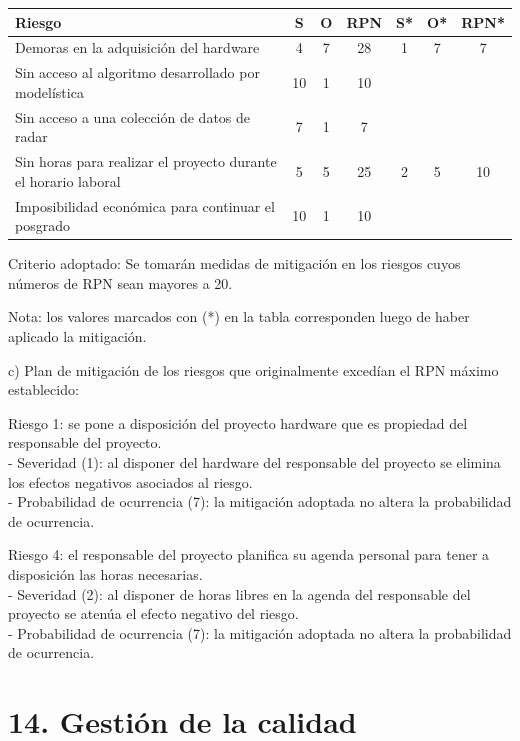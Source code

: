 \documentclass[
11pt, %
]{charter}
\begin{document}
\begin{table}[htpb]
\centering
\begin{tabularx}{\linewidth}{@{}|X|c|c|c|c|c|c|@{}}
\hline
\rowcolor[HTML]{C0C0C0} 
Riesgo                                                         & S & O & RPN & S* & O* & RPN* \\ \hline
Demoras en la adquisición del hardware                         & 4 & 7 &  28 & 1  & 7  &  7   \\ \hline
Sin acceso al algoritmo desarrollado por modelística           &10 & 1 &  10 &    &    &      \\ \hline
Sin acceso a una colección de datos de radar                   & 7 & 1 &   7 &    &    &      \\ \hline
Sin horas para realizar el proyecto durante el horario laboral & 5 & 5 &  25 & 2  & 5  &  10  \\ \hline
Imposibilidad económica para continuar el posgrado             &10 & 1 &  10 &    &    &      \\ \hline
\end{tabularx}%
\end{table}

Criterio adoptado: 
Se tomarán medidas de mitigación en los riesgos cuyos números de RPN sean
mayores a 20.

Nota: los valores marcados con (*) en la tabla corresponden luego de haber aplicado la mitigación.

c) Plan de mitigación de los riesgos que originalmente excedían el RPN máximo establecido:
 
Riesgo 1: se pone a disposición del proyecto hardware que es propiedad del
responsable del proyecto. \\
  - Severidad (1): al disponer del hardware del responsable del proyecto se
  elimina los efectos negativos asociados al riesgo.\\
  - Probabilidad de ocurrencia (7): la mitigación adoptada no altera la
  probabilidad de ocurrencia.

Riesgo 4: el responsable del proyecto planifica su agenda personal para tener a
disposición las horas necesarias.\\
  - Severidad (2): al disponer de horas libres en la agenda del responsable del
  proyecto se atenúa el efecto negativo del riesgo.\\
  - Probabilidad de ocurrencia (7): la mitigación adoptada no altera la
  probabilidad de ocurrencia.

\section{14. Gestión de la calidad}
\label{sec:calidad}
\end{document}
